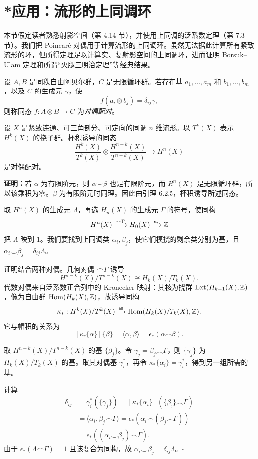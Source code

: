 \section{*应用：流形的上同调环}
本节假定读者熟悉射影空间（第 4.14 节），并使用上同调的泛系数定理（第 7.3 节）。我们把 Poincaré 对偶用于计算流形的上同调环。虽然无法据此计算所有紧致流形的环，但所得定理足以计算实、复射影空间的上同调环，进而证明 Borsuk--Ulam 定理和所谓“火腿三明治定理”等经典结果。

设 $A,B$ 是同秩自由阿贝尔群，$C$ 是无限循环群。若存在基 $a_1,\ldots,a_m$ 和 $b_1,\ldots,b_m$，以及 $C$ 的生成元 $\gamma$，使
\[f(a_i\otimes b_j)=\delta_{ij}\gamma,\]
则称同态 $f:A\otimes B\to C$ 为\emph{对偶配对}。

设 $X$ 是紧致连通、可三角剖分、可定向的同调 $n$ 维流形。以 $T^k(X)$ 表示 $H^k(X)$ 的挠子群。杯积诱导的同态
\[\frac{H^k(X)}{T^k(X)}\otimes\frac{H^{n-k}(X)}{T^{n-k}(X)}\longrightarrow H^n(X)\]
是对偶配对。

\textbf{证明：}若 $\alpha$ 为有限阶元，则 $\alpha\smile\beta$ 也是有限阶元，而 $H^n(X)$ 是无限循环群，所以该乘积为零。$\beta$ 为有限阶元时同理。因此由引理 6.2.5，杯积诱导所述同态。

取 $H^n(X)$ 的生成元 $\Lambda$，再选 $H_n(X)$ 的生成元 $\Gamma$ 的符号，使同构
\[H^n(X)\xrightarrow{\frown\Gamma}H_0(X)\xrightarrow{\epsilon_*}\mathbb{Z}\]
把 $\Lambda$ 映到 $1$。我们要找到上同调类 $\alpha_i,\beta_j$，使它们模挠的剩余类分别为基，且 $\alpha_i\smile\beta_j=\delta_{ij}\Lambda$。

证明结合两种对偶。几何对偶 $\frown\Gamma$ 诱导
\[H^{n-k}(X)/T^{n-k}(X)\cong H_k(X)/T_k(X).\]
代数对偶来自泛系数正合列中的 Kronecker 映射：其核为挠群 $\operatorname{Ext}(H_{k-1}(X),\mathbb{Z})$，像为自由群 $\operatorname{Hom}(H_k(X),\mathbb{Z})$，故诱导同构
\[\kappa_*:H^k(X)/T^k(X)\xrightarrow{\cong}
\operatorname{Hom}(H_k(X)/T_k(X),\mathbb{Z}).\]
它与帽积的关系为
\[[\kappa_*\{\alpha\}]\{\beta\}=\langle\alpha,\beta\rangle=\epsilon_*(\alpha\frown\beta).\]

取 $H^{n-k}(X)/T^{n-k}(X)$ 的基 $\{\beta_j\}$。令 $\gamma_j=\beta_j\frown\Gamma$，则 $\{\gamma_j\}$ 为 $H_k(X)/T_k(X)$ 的基。取其对偶基 $\gamma_i^*$，再令 $\kappa_*\{\alpha_i\}=\gamma_i^*$，得到另一组所需的基。

计算
\begin{align*}
\delta_{ij}&=\gamma_i^*(\{\gamma_j\})
=[\kappa_*\{\alpha_i\}](\{\beta_j\}\frown\Gamma)\\
&=\langle\alpha_i,\beta_j\frown\Gamma\rangle
=\epsilon_*(\alpha_i\frown(\beta_j\frown\Gamma))\\
&=\epsilon_*((\alpha_i\smile\beta_j)\frown\Gamma).
\end{align*}
由于 $\epsilon_*(\Lambda\frown\Gamma)=1$ 且该复合为同构，故 $\alpha_i\smile\beta_j=\delta_{ij}\Lambda$。\hfill$\square$

